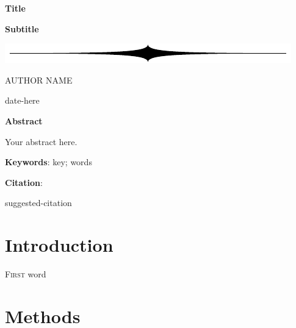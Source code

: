 \documentclass[12pt]{extarticle}
\begin{document}
\thispagestyle{empty}


\bigskip
\bigskip

{\selectfont
\color{Mahogany}
\centerline{\huge{\textbf{Title}}} 
\bigskip
\centerline{\Large{\textbf{Subtitle}}}
}

\bigskip
\bigskip

\centerline{\includegraphics[scale=0.25]{divider}}

\bigskip
\bigskip

\centerline{ \large AUTHOR NAME\footnotemark}

\bigskip

\centerline{ date-here }


\bigskip
\bigskip

\noindent \textbf{Abstract}

Your abstract here.

\bigskip

\textbf{Keywords}: key; words

\bigskip

\textbf{Citation}:

suggested-citation

\bigskip
\bigskip
\newpage

\section{Introduction}

\lettrine[lines=3,lraise=0.1, nindent=0em]{F}{irst} word \lipsum[1]


\lipsum[1]

\section{Methods}
\lipsum[1]
\end{document}
